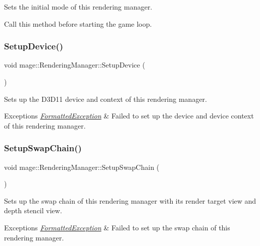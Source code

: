 Sets the initial mode of this rendering manager.

Call this method before starting the game loop. \hypertarget{classmage_1_1_rendering_manager_a45d4cadcd572290f352027b5fa86b4f6}{}\label{classmage_1_1_rendering_manager_a45d4cadcd572290f352027b5fa86b4f6} 
\subsubsection{\texorpdfstring{Setup\+Device()}{SetupDevice()}}
{\footnotesize\ttfamily void mage\+::\+Rendering\+Manager\+::\+Setup\+Device (\begin{DoxyParamCaption}{ }\end{DoxyParamCaption})\hspace{0.3cm}{\ttfamily [private]}}

Sets up the D3\+D11 device and context of this rendering manager.


\begin{DoxyExceptions}{Exceptions}
{\em \hyperlink{structmage_1_1_formatted_exception}{Formatted\+Exception}} & Failed to set up the device and device context of this rendering manager. \\
\hline
\end{DoxyExceptions}
\hypertarget{classmage_1_1_rendering_manager_a53cef2fcaff8947f4aa93eb87e247362}{}\label{classmage_1_1_rendering_manager_a53cef2fcaff8947f4aa93eb87e247362} 
\subsubsection{\texorpdfstring{Setup\+Swap\+Chain()}{SetupSwapChain()}}
{\footnotesize\ttfamily void mage\+::\+Rendering\+Manager\+::\+Setup\+Swap\+Chain (\begin{DoxyParamCaption}{ }\end{DoxyParamCaption})\hspace{0.3cm}{\ttfamily [private]}}

Sets up the swap chain of this rendering manager with its render target view and depth stencil view.


\begin{DoxyExceptions}{Exceptions}
{\em \hyperlink{structmage_1_1_formatted_exception}{Formatted\+Exception}} & Failed to set up the swap chain of this rendering manager. \\
\hline
\end{DoxyExceptions}
\hypertarget{classmage_1_1_rendering_manager_aae67558bce110b0fba0a3ccdfeb64431}{}\label{classmage_1_1_rendering_manager_aae67558bce110b0fba0a3ccdfeb64431} 
